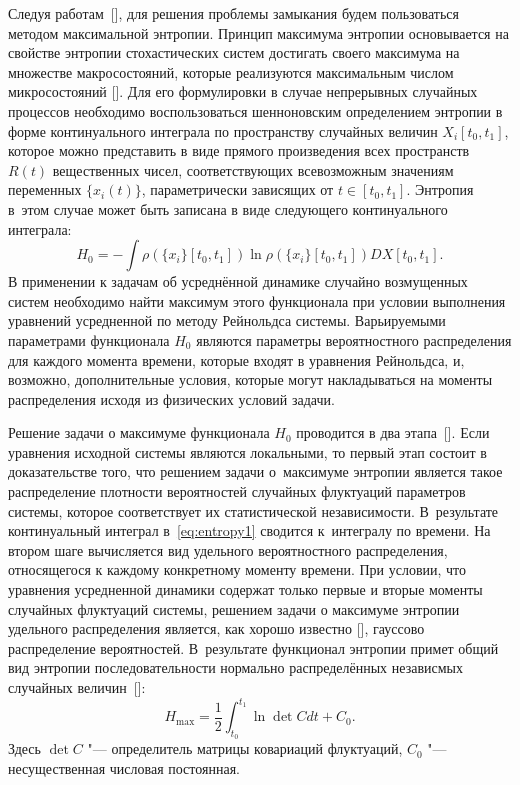Следуя работам~[], для решения проблемы замыкания будем пользоваться методом максимальной энтропии. 
Принцип максимума энтропии основывается на свойстве энтропии стохастических систем достигать своего максимума
на множестве макросостояний, которые реализуются максимальным числом микросостояний []. 
Для его формулировки в случае непрерывных случайных процессов необходимо воспользоваться шенноновским определением энтропии в форме континуального интеграла по пространству случайных величин
$X_i[t_0,t_1]$, которое можно представить в виде прямого произведения всех пространств $R(t)$ вещественных чисел,
соответствующих всевозможным значениям переменных $\{x_i(t)\}$, параметрически зависящих от $t\in[t_0,t_1]$. 
Энтропия в~этом случае может быть записана в виде следующего континуального интеграла:
\begin{equation}
        H_0 = -\int\rho(\{x_i\}[t_0,t_1])\ln\rho(\{x_i\}[t_0,t_1])
        DX[t_0,t_1].                         \label{eq:entropy1}
\end{equation}
В применении к задачам об усреднённой динамике случайно возмущенных систем необходимо найти максимум этого функционала при условии выполнения уравнений усредненной по методу Рейнольдса системы. 
Варьируемыми параметрами функционала $H_0$ являются параметры вероятностного распределения для каждого момента времени, которые входят в уравнения Рейнольдса, и, возможно, дополнительные условия, которые могут накладываться на моменты распределения исходя из физических условий задачи.

Решение  задачи о максимуме функционала $H_0$ проводится в два этапа~[].
Если уравнения исходной системы являются локальными, то первый этап состоит в доказательстве того, что решением задачи о~максимуме энтропии является такое распределение плотности вероятностей случайных флуктуаций параметров системы, которое
соответствует их статистической независимости.  
В~результате континуальный интеграл в~\eqref{eq:entropy1} сводится к~интегралу по времени. 
На втором шаге вычисляется вид удельного вероятностного распределения, относящегося к каждому конкретному
моменту времени. 
При условии, что уравнения усредненной динамики содержат только первые и вторые моменты случайных флуктуаций
системы, решением задачи о максимуме энтропии удельного распределения является, как хорошо известно
[], гауссово распределение вероятностей. 
В~результате функционал энтропии примет общий вид энтропии последовательности нормально распределённых независмых случайных величин~[]:
\begin{equation}
         H_{\max} =  \frac{1}{2}\int_{t_0}^{t_1} \ln\det C dt + C_0.   \label{eq:DefHC}
\end{equation}
Здесь $\det C$ "--- определитель матрицы     ковариаций флуктуаций, $C_0$ "---     несущественная числовая постоянная.

